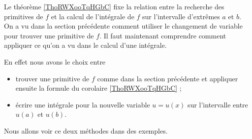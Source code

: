 Le théorème \ref{ThoRWXooTqHGbC} fixe la relation entre la recherche des primitives de $f $ et la calcul de l'intégrale de $f$ sur l'intervalle d'extrêmes $a$ et $b$. On a vu dans la section précédente comment utiliser le changement de variable pour trouver une primitive de $f$. Il faut maintenant comprendre comment appliquer ce qu'on a vu dans le calcul d'une intégrale.

En effet nous avons le choix entre
\begin{itemize}
\item trouver une primitive de $f$ comme dans la section précédente et appliquer ensuite la formule du corolaire \ref{ThoRWXooTqHGbC} ;
\item écrire une intégrale pour la nouvelle variable $u = u(x)$ sur l'intervalle entre $u(a)$ et $u(b)$.
\end{itemize}

Nous allons voir ce deux méthodes dans des exemples.


